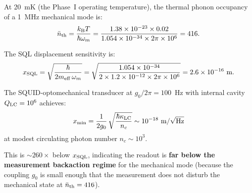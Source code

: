 \documentclass[11pt]{article}
\newcommand{\ee}[1]{\times 10^{#1}}
\newcommand{\kB}{k_{\mathrm{B}}}
\theoremstyle{definition}
\theoremstyle{remark}
\begin{document}
At 20~mK (the Phase~I operating temperature), the thermal phonon
occupancy of a 1~MHz mechanical mode is:
\begin{equation}
\bar{n}_{\rm th} = \frac{\kB T}{\hbar\omega_m}
= \frac{1.38\ee{-23}\times 0.02}{1.054\ee{-34}\times 2\pi\times 10^6}
= 416.
\end{equation}

The SQL displacement sensitivity is:
\begin{equation}
x_{\rm SQL} = \sqrt{\frac{\hbar}{2 m_{\rm eff}\,\omega_m}}
= \sqrt{\frac{1.054\ee{-34}}{2\times 1.2\ee{-12}\times 2\pi\times 10^6}}
= 2.6\ee{-16}~\text{m}.
\end{equation}

The SQUID-optomechanical transducer at $g_0/2\pi = 100$~Hz with
internal cavity $Q_{\rm LC} = 10^6$ achieves:
\begin{equation}
x_{\rm min} = \frac{1}{2g_0}\,\sqrt{\frac{\hbar\kappa_{\rm LC}}{n_c}}
\sim 10^{-18}~\text{m}/\sqrt{\text{Hz}}
\end{equation}
at modest circulating photon number $n_c \sim 10^3$.

This is $\sim 260\times$ below $x_{\rm SQL}$, indicating the readout
is \textbf{far below the measurement backaction regime} for the
mechanical mode (because the coupling $g_0$ is small enough that
the measurement does not disturb the mechanical state at $\bar{n}_{\rm th}
= 416$).
\end{document}
